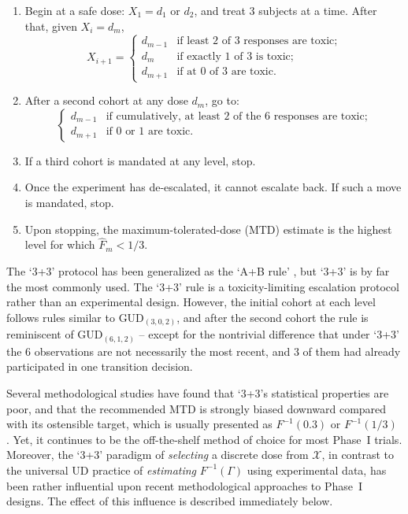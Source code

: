 \begin{enumerate}
\item Begin at a safe dose: $X_1=d_1$ or $d_2$, and treat 3 subjects at a time. After that, given $X_i=d_m$,
\begin{equation*}
X_{i+1}=
\begin{cases}
d_{m-1} &\textrm{if least $2$ of $3$ responses are toxic;} \\
d_m &\textrm{if exactly $1$ of $3$ is toxic;}\\
d_{m+1} &\textrm{if at $0$ of $3$ are toxic.}
\end{cases}
\end{equation*}
\item After a second cohort at any dose $d_m$, go to:
\begin{equation*}
\begin{cases}
 d_{m-1} &\textrm{if cumulatively, at least $2$ of the $6$ responses are toxic;} \\
 d_{m+1} &\textrm{if $0$ or $1$ are toxic.}
\end{cases}
\end{equation*}
\item If a third cohort is mandated at any level, stop.
\item Once the experiment has de-escalated, it cannot escalate back. If such a move is mandated, stop.
\item Upon stopping, the maximum-tolerated-dose (MTD) estimate is the highest level for which $\hat{F}_m<1/3$.
\end{enumerate}

The `3+3' protocol has been generalized as the `A+B rule' \citep{Lin:Shih:stat:2001}, but `3+3' is by far the most commonly used. The `3+3' rule is a toxicity-limiting escalation protocol rather than an experimental design. However, the initial cohort at each level follows rules similar to GUD$_{(3,0,2)}$, and after the second cohort the rule is reminiscent of GUD$_{(6,1,2)}$ -- except for the nontrivial difference that under `3+3' the 6 observations are not necessarily the most recent, and 3 of them had already participated in one transition decision.

Several methodological studies have found that `3+3's statistical properties are poor, and that the recommended MTD is strongly biased downward compared with its ostensible target, which is usually presented as $F^{-1}(0.3)$ or $F^{-1}(1/3)$ \citep{Rein:Paol:O'Qu:oper:1999,Lin:Shih:stat:2001}. Yet, it continues to be the off-the-shelf method of choice for most Phase~I trials. Moreover, the `3+3' paradigm of \emph{selecting} a discrete dose from $\mathcal{X}$, in contrast to the universal UD practice of \emph{estimating} $F^{-1}(\Gamma)$ using experimental data, has been rather influential upon recent methodological approaches to Phase~I designs. The effect of this influence is described immediately below.

